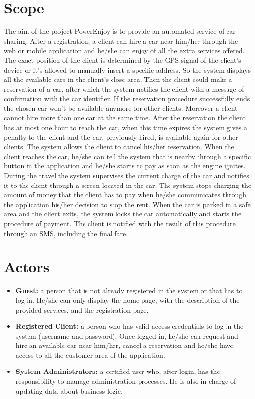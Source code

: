\section{Scope}
The aim of the project PowerEnjoy is to provide an automated service of car sharing.
After a registration, a client can hire a car near him/her through the web or mobile application and he/she can enjoy of all the extra services offered.
The exact position of the client is determined by the GPS signal of the client’s device or it’s allowed to manually insert a specific address.
So the system displays all the available cars in the client’s close area.
Then the client could make a reservation of a car, after which the system notifies the client with a message of confirmation with the car identifier.
If the reservation procedure successfully ends the chosen car won’t be available anymore for other clients.
Moreover a client cannot hire more than one car at the same time.
After the reservation the client has at most one hour to reach the car, when this time expires the system gives a penalty to the client and the car, previously hired, is available again for other clients.
The system allows the client to cancel his/her reservation.
When the client reaches the car, he/she can tell the system that is nearby through a specific button in the application and he/she starts to pay as soon as the engine ignites.
During the travel the system supervises the current charge of the car and notifies it to the client through a screen located in the car.
The system stops charging the amount of money that the client has to pay when he/she communicates through the application his/her decision to stop the rent.
When the car is parked in a safe area and the client exits, the system locks the car automatically and starts the procedure of payment.
The client is notified with the result of this procedure through an SMS, including the final fare.

\section{Actors}
\begin{itemize}
\item \textbf{Guest:} a person that is not already registered in the system or that has to log in.
He/she can only display the home page, with the description of the provided services, and the registration page.
\item \textbf{Registered Client:} a person who has valid access credentials to log in the system (username and password).
Once logged in, he/she can request and hire an available car near him/her, cancel a reservation and he/she have access to all the customer area of the application.
\item \textbf{System Administrators:} a certified user who, after login, has the responsibility to manage administration processes.
He is also in charge of updating data about business logic.

\end{itemize}
